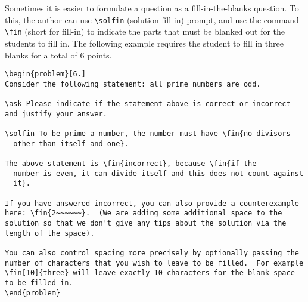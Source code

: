 \begin{cluster}
\label{grp:xmpl:quiz::fill-in-the-blanks-questions}

\begin{example}
\label{xmpl:quiz::fill-in-the-blanks-questions}
Sometimes it is easier to formulate a question as a fill-in-the-blanks
question.  To this, the author can use \lstinline`\solfin`
(solution-fill-in) prompt, and
use the command \lstinline`\fin` (short for fill-in) to indicate the
parts that must be blanked  out for  the students to fill in.
The following example requires the student
to fill in three blanks for a total of $6$ points.

\begin{lstlisting}
\begin{problem}[6.]
Consider the following statement: all prime numbers are odd.

\ask Please indicate if the statement above is correct or incorrect
and justify your answer.

\solfin To be prime a number, the number must have \fin{no divisors
  other than itself and one}.

The above statement is \fin{incorrect}, because \fin{if the
  number is even, it can divide itself and this does not count against
  it}.

If you have answered incorrect, you can also provide a counterexample
here: \fin{2~~~~~~}.  (We are adding some additional space to the
solution so that we don't give any tips about the solution via the
length of the space).

You can also control spacing more precisely by optionally passing the
number of characters that you wish to leave to be filled.  For example
\fin[10]{three} will leave exactly 10 characters for the blank space
to be filled in.
\end{problem}
\end{lstlisting}

\end{example}
\end{cluster}

